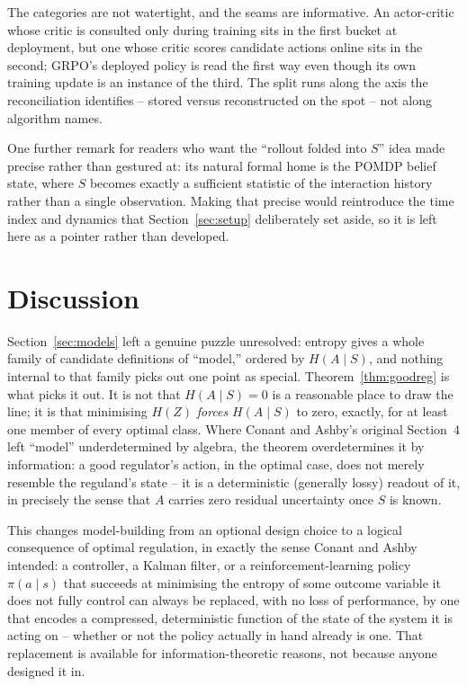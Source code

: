 \documentclass[11pt]{article}
\theoremstyle{definition}
\theoremstyle{remark}
\begin{document}
The categories are not watertight, and the seams are informative. An
actor-critic whose critic is consulted only during training sits in the
first bucket at deployment, but one whose critic scores candidate actions
online sits in the second; GRPO's deployed policy is read the first way
even though its own training update is an instance of the third. The
split runs along the axis the reconciliation identifies -- stored versus
reconstructed on the spot -- not along algorithm names.

One further remark for readers who want the ``rollout folded into $S$''
idea made precise rather than gestured at: its natural formal home is the
POMDP belief state, where $S$ becomes exactly a sufficient statistic of
the interaction history rather than a single observation. Making that
precise would reintroduce the time index and dynamics that
Section~\ref{sec:setup} deliberately set aside, so it is left here as a
pointer rather than developed.

\section{Discussion}

Section~\ref{sec:models} left a genuine puzzle unresolved: entropy gives a
whole family of candidate definitions of ``model,'' ordered by
$H(A\mid S)$, and nothing internal to that family picks out one point as
special. Theorem~\ref{thm:goodreg} is what picks it out. It is not that
$H(A\mid S)=0$ is a reasonable place to draw the line; it is that
minimising $H(Z)$ \emph{forces} $H(A\mid S)$ to zero, exactly, for at least
one member of every optimal class. Where Conant and Ashby's original
Section~4 left ``model'' underdetermined by algebra, the theorem
overdetermines it by information: a good regulator's action, in the
optimal case, does not merely resemble the reguland's state -- it is a
deterministic (generally lossy) readout of it, in precisely the sense that
$A$ carries zero residual uncertainty once $S$ is known.

This changes model-building from an optional design choice to a logical
consequence of optimal regulation, in exactly the sense Conant and Ashby
intended: a controller, a Kalman filter, or a reinforcement-learning
policy $\pi(a\mid s)$ that succeeds at minimising the entropy of some
outcome variable it does not fully control can always be replaced, with
no loss of performance, by one that encodes a compressed, deterministic
function of the state of the system it is acting on -- whether or not the
policy actually in hand already is one. That replacement is available for
information-theoretic reasons, not because anyone designed it in.
\end{document}
